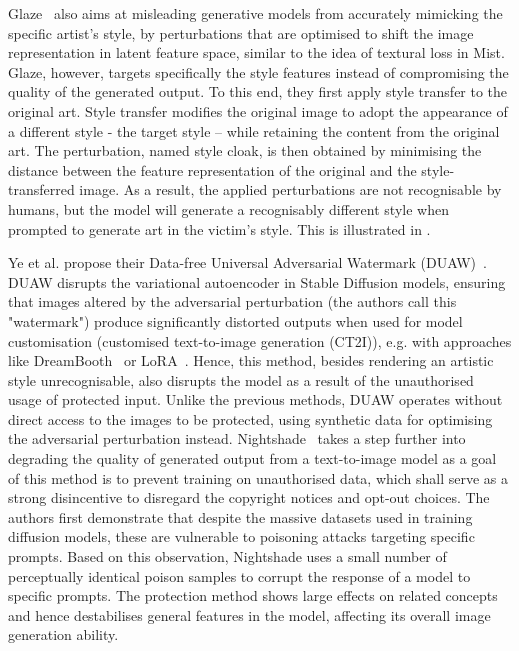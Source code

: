 \documentclass[conference,table]{IEEEtran} %
\begin{document}
Glaze~\cite{shan_glaze_2023} also aims at misleading generative models from accurately mimicking the specific artist's style, by perturbations that are optimised to shift the image representation in latent feature space, similar to the idea of textural loss in Mist.
Glaze, however, targets specifically the style features instead of compromising the quality of the generated output. 
To this end, they first apply style transfer to the original art. 
Style transfer modifies the original image to adopt the appearance of a different style - the target style -- while retaining the content from the original art. 
The perturbation, named style cloak, is then obtained by minimising the distance between the feature representation of the original and the style-transferred image.
As a result, the applied perturbations are not recognisable by humans, but the model will generate a recognisably different style when prompted to generate art in the victim's style. This is illustrated in . 

Ye et al. propose their Data-free Universal Adversarial Watermark (DUAW)~\cite{ye_duaw_2023}. 
DUAW disrupts the variational autoencoder in Stable Diffusion models, ensuring that images altered by the adversarial perturbation (the authors call this "watermark") produce significantly distorted outputs when used for model customisation (customised text-to-image generation (CT2I)), e.g. with approaches like DreamBooth~\cite{ruiz_dreambooth_2023} or LoRA~\cite{hu_lora_2021}. 
Hence, this method, besides rendering an artistic style unrecognisable, also disrupts the model as a result of the unauthorised usage of protected input. 
Unlike the previous methods, DUAW operates without direct access to the images to be protected, using synthetic data for optimising the adversarial perturbation instead. 
Nightshade~\cite{shan_prompt-specific_2023} takes a step further into degrading the quality of generated output from a text-to-image model as a goal of this method is to prevent training on unauthorised data, which shall serve as a strong disincentive to disregard the copyright notices and opt-out choices. 
The authors first demonstrate that despite the massive datasets used in training diffusion models, these are vulnerable to poisoning attacks targeting specific prompts. 
Based on this observation, Nightshade uses a small number of perceptually identical poison samples to corrupt the response of a model to specific prompts. 
The protection method shows large effects on related concepts and hence destabilises general features in the model, affecting its overall image generation ability.
\end{document}
